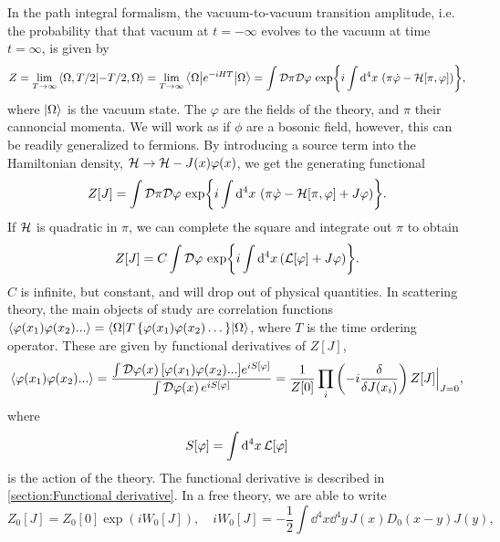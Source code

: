 In the path integral formalism, the vacuum-to-vacuum transition amplitude, i.e. the probability that that vacuum at $t = -\infty$ evolves to the vacuum at time $t = \infty$, is given by
\begin{equation}
    Z = \lim_{T\rightarrow \infty} \braket{\Omega, T/2}{-T/2, \Omega}
    = \lim_{T\rightarrow \infty} \left\langle \Omega {\left|  e^{-iHT}  \right|} \Omega \right\rangle
    = \int \mathcal{D} \pi \mathcal{D} \varphi \, \exp{ i \int \dd^4 x \, \left(\pi \dot \varphi - \mathcal{H}[\pi, \varphi]\right) },
\end{equation}
where $\ket{\Omega}$ is the vacuum state.
The  $\varphi$ are the fields of the theory, and $\pi$ their cannoncial momenta. We will work as if $\phi$ are a bosonic field, however, this can be readily generalized to fermions.
By introducing a source term into the Hamiltonian density, $\mathcal{H} \rightarrow \mathcal{H} - J(x)\varphi(x)$, we get the generating functional
\begin{equation}
    Z[J] = 
    \int \mathcal{D} \pi \mathcal{D} \varphi \, 
    \exp{ i \int \dd^4 x \, \left(\pi \dot \varphi - \mathcal{H}[\pi, \varphi]+ J\varphi\right) }.
\end{equation}
If $\mathcal{H}$ is quadratic in $\pi$, we can complete the square and integrate out $\pi$ to obtain
\begin{equation}
    Z[J] = C \int \mathcal{D} \varphi \, \exp{i \int \dd^4 x\, (\mathcal{L}[\varphi] + J \varphi)}.
\end{equation}
$C$ is infinite, but constant, and will drop out of physical quantities.
In scattering theory, the main objects of study are correlation functions $\ex{\varphi(x_1)\varphi(x_2)...} = \inner{\Omega}{T\left\{\varphi(x_1)\varphi(x_2)\dots\right\}}{\Omega}$, where $T$ is the time ordering operator.
These are given by functional derivatives of $Z[J]$, 
\begin{equation}
    \label{correlator from generating functional}
    \ex{\varphi(x_1)\varphi(x_2)...}
    = 
    \frac{\int \D \varphi(x)\, [\varphi(x_1)\varphi(x_2)...] e^{i S[\varphi]}}
        {\int \D \varphi(x)\, e^{i S[\varphi]}}
    =
    \frac{1}{Z[0]} \prod_i\left( -i  \fdv{J(x_i)}\right) Z[J]\Big|_{J = 0},
\end{equation}
where 
\begin{equation}
    S[\varphi] = \int \dd^4 x \, \mathcal{L}[\varphi]
\end{equation}
is the action of the theory.
The functional derivative is described in \autoref{section:Functional derivative}.
In a free theory, we are able to write
\begin{equation}
    Z_0[J] = Z_0[0] \exp(i W_0[J]), \quad 
    iW_0[J] = -\frac{1}{2} \int \dd^4 x \dd^4 y \, J(x) D_0(x - y) J(y),
\end{equation}
